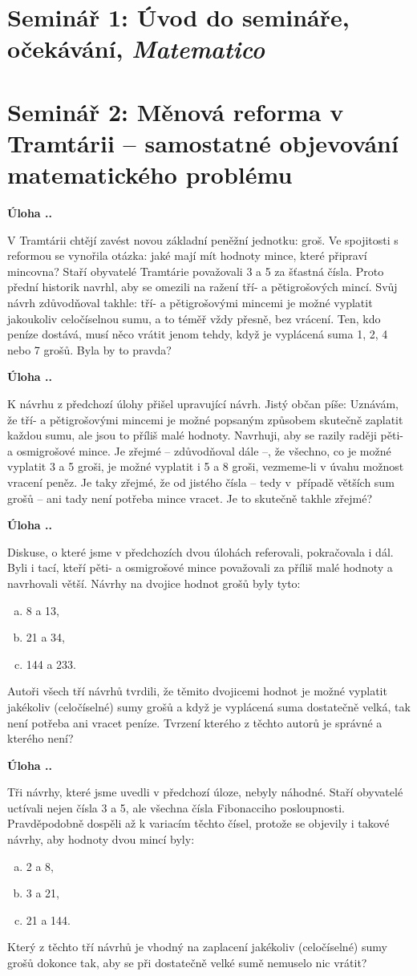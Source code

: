 \documentclass{article}
\newcounter{seminar}
\newcounter{problem}
\newcommand{\seminar}[2]{
  \clearpage
  \setcounter{seminar}{#1}
  \setcounter{problem}{0}
  \section*{Seminář #1: #2}
}
\newcommand{\source}[1]{
  \def\temp{#1}\ifx\temp\empty
  \else
    [#1]
  \fi
}
\newcommand{\problem}[3]{
  \stepcounter{problem}
  \noindent\textbf{Úloha \theseminar .\theproblem.}
    \source{#1} #2
  \bigskip
}
\begin{document}
\seminar{1}{Úvod do semináře, očekávání, \textit{Matematico}}

\seminar{2}{Měnová reforma v Tramtárii -- samostatné objevování matematického problému}

\problem{}{
V Tramtárii chtějí zavést novou základní peněžní jednotku: groš. Ve spojitosti s reformou se vynořila otázka: jaké mají mít hodnoty mince, které připraví mincovna? Staří obyvatelé Tramtárie považovali 3 a 5 za šťastná čísla. Proto přední historik navrhl, aby se omezili na ražení tří- a pětigrošových mincí. Svůj návrh zdůvodňoval takhle: tří- a pětigrošovými mincemi je možné vyplatit jakoukoliv celočíselnou sumu, a to téměř vždy přesně, bez vrácení. Ten, kdo peníze dostává, musí něco vrátit jenom tehdy, když je vyplácená suma 1, 2, 4 nebo 7 grošů. Byla by to pravda?
}{
}

\problem{}{
K návrhu z předchozí úlohy přišel upravující návrh. Jistý občan píše: Uznávám, že tří- a pětigrošovými mincemi je možné popsaným způsobem skutečně zaplatit každou sumu, ale jsou to příliš malé hodnoty. Navrhuji, aby se razily raději pěti- a osmigrošové mince. Je zřejmé -- zdůvodňoval dále --, že všechno, co je možné vyplatit 3 a 5 groši, je možné vyplatit i 5 a 8 groši, vezmeme-li v úvahu možnost vracení peněz. Je taky zřejmé, že od jistého čísla -- tedy v~případě větších sum grošů -- ani tady není potřeba mince vracet. Je to skutečně takhle zřejmé?
}{
}

\problem{}{
Diskuse, o které jsme v předchozích dvou úlohách referovali, pokračovala i dál. Byli i tací, kteří pěti- a osmigrošové mince považovali za příliš malé hodnoty a navrhovali větší. Návrhy na dvojice hodnot grošů byly tyto:
\begin{enumerate}[a)]
\item 8 a 13,
\item 21 a 34, 
\item 144 a 233.
\end{enumerate}
Autoři všech tří návrhů tvrdili, že těmito dvojicemi hodnot je možné vyplatit jakékoliv (celočíselné) sumy grošů a když je vyplácená suma dostatečně velká, tak není potřeba ani vracet peníze. Tvrzení kterého z těchto autorů je správné a kterého není?
}{
}

\problem{}{
Tři návrhy, které jsme uvedli v předchozí úloze, nebyly náhodné. Staří obyvatelé uctívali nejen čísla 3 a 5, ale všechna čísla Fibonacciho posloupnosti. Pravděpodobně dospěli až k variacím těchto čísel, protože se objevily i takové návrhy, aby hodnoty dvou mincí byly:
\begin{enumerate}[a)]
\item 2 a 8,
\item 3 a 21, 
\item 21 a 144.
\end{enumerate}
Který z těchto tří návrhů je vhodný na zaplacení jakékoliv (celočíselné) sumy grošů dokonce tak, aby se při dostatečně velké sumě nemuselo nic vrátit?
}{
}
\end{document}
